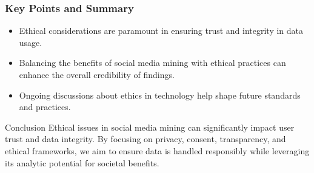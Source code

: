\documentclass{beamer}
\begin{document}
\begin{frame}[fragile]
    \frametitle{Key Points and Summary}
    \begin{itemize}
        \item Ethical considerations are paramount in ensuring trust and integrity in data usage.
        \item Balancing the benefits of social media mining with ethical practices can enhance the overall credibility of findings.
        \item Ongoing discussions about ethics in technology help shape future standards and practices.
    \end{itemize}

    \begin{block}{Conclusion}
        Ethical issues in social media mining can significantly impact user trust and data integrity. By focusing on privacy, consent, transparency, and ethical frameworks, we aim to ensure data is handled responsibly while leveraging its analytic potential for societal benefits.
    \end{block}
\end{frame}
\end{document}
